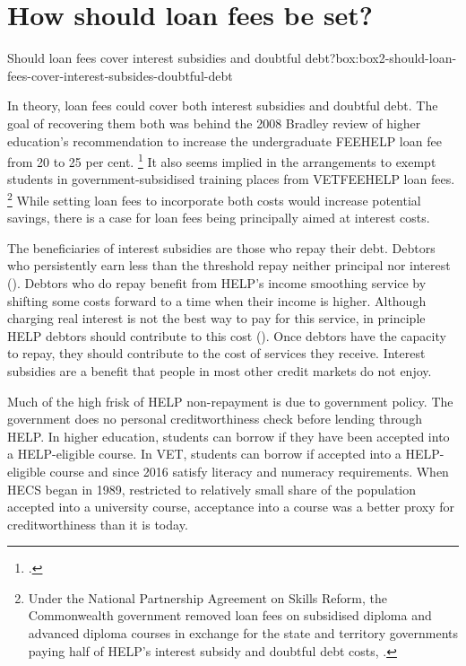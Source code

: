 \documentclass[embargoed]{grattan}
\begin{document}
\section{How should loan fees be set?}\label{how-should-loan-fees-be-set}


\begin{bigbox*}{Should loan fees cover interest subsidies and doubtful debt?}{box:box2-should-loan-fees-cover-interest-subsides-doubtful-debt}

In theory, loan fees could cover both interest subsidies and doubtful debt.
The goal of recovering them both was behind the 2008 Bradley review of higher education's recommendation to increase the undergraduate \gls{FEEHELP} loan fee from 20 to 25 per cent.%
\footcite[][167--168]{Bradley2008ReviewAustralianhigher}
It also seems implied in the arrangements to exempt students in government-subsidised training places from \gls{VETFEEHELP} loan fees.%
\footnote{Under the National Partnership Agreement on Skills Reform, the Commonwealth government removed loan fees on subsidised diploma and advanced diploma courses in exchange for the state and territory governments paying half of \gls{HELP}'s interest subsidy and doubtful debt costs, \textcite[][25]{AustralianGovernments2012NationalPartnershipAgreement}.} While setting loan fees to incorporate both costs would increase potential savings, there is a case for loan fees being principally aimed at interest costs.

The beneficiaries of interest subsidies are those who repay their debt.
Debtors who persistently earn less than the threshold repay neither principal nor interest ().
Debtors who do repay benefit from \gls{HELP}'s income smoothing service by shifting some costs forward to a time when their income is higher.
Although charging real interest is not the best way to pay for this service, in principle \gls{HELP} debtors should contribute to this cost ().
Once debtors have the capacity to repay, they should contribute to the cost of services they receive.
Interest subsidies are a benefit that people in most other credit markets do not enjoy.

Much of the high frisk of \gls{HELP} non-repayment is due to government policy.
The government does no personal creditworthiness check before lending through \gls{HELP}.
In higher education, students can borrow if they have been accepted into a \gls{HELP}-eligible course.
In VET, students can borrow if accepted into a \gls{HELP}-eligible course and since 2016 satisfy literacy and numeracy requirements.
When \gls{HECS} began in 1989, restricted to relatively small share of the population accepted into a university course, acceptance into a course was a better proxy for creditworthiness than it is today.


\end{bigbox*}
\end{document}
